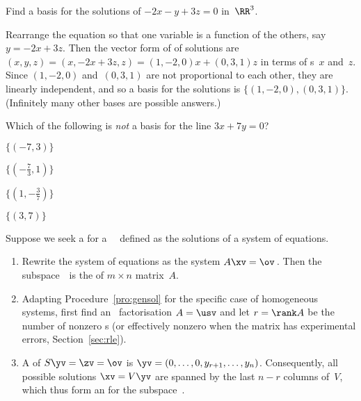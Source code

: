 \begin{example} \label{eg:}
Find a basis for the solutions of \(-2x-y+3z=0\) in~\(\RR^3\).
\begin{solution} 
Rearrange the equation so that one variable is a function of the others, say \(y=-2x+3z\).
Then the vector form of of solutions are \((x,y,z)=(x,-2x+3z,z)=(1,-2,0)x+(0,3,1)z\) in terms of s~\(x\) and~\(z\).
Since \((1,-2,0)\) and~\((0,3,1)\) are not proportional to each other, they are linearly independent, and so a basis for the solutions is \(\{(1,-2,0),(0,3,1)\}\).
(Infinitely many other bases are possible answers.)
\end{solution}
\end{example}



\begin{activity}
Which of the following is \emph{not} a basis for the line \(3x+7y=0\)?
\begin{parts}
\item \(\{(-7,3)\}\)
\item \(\{(-\frac73,1)\}\)
\item \(\{(1,-\frac37)\}\)
\item \(\{(3,7)\}\) \actans
\end{parts}
\end{activity}





\begin{procedure} \label{pro:bfe}
Suppose we seek a  for a ~\WW\ defined as the solutions of a system of equations.
\begin{enumerate}
\item Rewrite the system of equations as the  system \(A\xv=\ov\)\,. 
Then the subspace~\WW\ is the  of \(m\times n\) matrix~\(A\).
\item  Adapting Procedure~\ref{pro:gensol} for the specific case of homogeneous systems, first find an \svd\ factorisation \(A=\usv\) and let \(r=\rank A\) be the number of nonzero s (or effectively nonzero when the matrix has experimental errors, Section~\ref{sec:rle}).
\item A  of \(S\yv=\zv=\ov\) is \(\yv=(0,\ldots,0,y_{r+1},\ldots,y_n)\).
Consequently, all possible solutions \(\xv=V\yv\) are spanned by the last \(n-r\) columns of~\(V\), which thus form an  for the subspace~\WW.
\end{enumerate}
\end{procedure}



